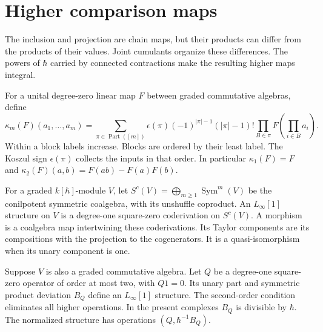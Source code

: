 \section{Higher comparison maps}
\label{cbc:cf:cumulants-section}

The inclusion and projection are chain maps, but their products
can differ from the products of their values. Joint cumulants
organize these differences. The powers of $\hbar$ carried by
connected contractions make the resulting higher maps integral.

For a unital degree-zero linear map $F$ between graded commutative
algebras, define
\begin{equation}\label{cbc:cf:cumulants}
 \kappa_m(F)(a_1,\ldots,a_m)
  =\sum_{\pi\in\operatorname{Part}([m])}
       \epsilon(\pi)(-1)^{|\pi|-1}(|\pi|-1)!
       \prod_{B\in\pi}F\left(\prod_{i\in B}a_i\right).
\end{equation}
Within a block labels increase. Blocks are ordered by their
least label. The Koszul sign $\epsilon(\pi)$ collects the
inputs in that order. In particular
$\kappa_1(F)=F$ and
$\kappa_2(F)(a,b)=F(ab)-F(a)F(b)$.

For a graded $k[\hbar]$-module $V$, let
$S^c(V)=\bigoplus_{m\geq1}\operatorname{Sym}^m(V)$ be
the conilpotent symmetric coalgebra, with its unshuffle
coproduct. An $L_\infty[1]$ structure on $V$ is a
degree-one square-zero coderivation on $S^c(V)$.
A morphism is a coalgebra map intertwining these coderivations.
Its Taylor components are its compositions with the projection
to the cogenerators. It is a quasi-isomorphism when its unary
component is one.

Suppose $V$ is also a graded commutative algebra.
Let $Q$ be a degree-one square-zero operator of order at most
two, with $Q1=0$. Its unary part and symmetric product deviation
$B_Q$ define an $L_\infty[1]$ structure.
The second-order condition eliminates all higher operations.
In the present complexes $B_Q$ is divisible by $\hbar$.
The normalized structure has
operations $(Q,\hbar^{-1}B_Q)$.

